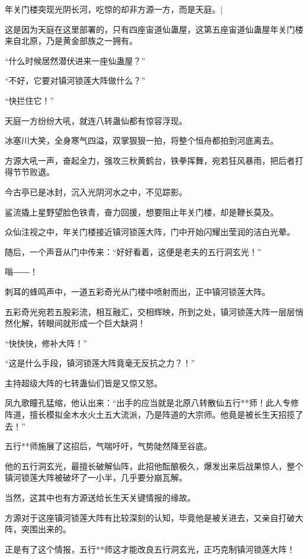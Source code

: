 
\begin{this_body}

年关门楼突现光阴长河，吃惊的却非方源一方，而是天庭。|

这是因为天庭在这里部署的，只有四座宙道仙蛊屋，这第五座宙道仙蛊屋年关门楼来自北原，乃是黄金部族之一拥有。

“什么时候居然潜伏进来一座仙蛊屋？”

“不好，它要对镇河锁莲大阵做什么？”

“快拦住它！”

天庭一方纷纷大吼，就连八转蛊仙都有惊容浮现。

冰塞川大笑，全身寒气四溢，双掌狠狠一拍，将整个恒舟都拍到河底离去。

方源大吼一声，奋起全力，强攻三秋黄鹤台，铁拳挥舞，宛若狂风暴雨，把后者打得节节败退。

今古亭已是冰封，沉入光阴河水之中，不见踪影。

鲨流撬上星野望脸色铁青，奋力回援，想要阻止年关门楼，却是鞭长莫及。

众仙注视之中，年关门楼接近镇河锁莲大阵，门中开始闪耀出莹润的洁白光晕。

随后，一个声音从门中传来：“好好看着，这便是老夫的五行洞玄光！”

嗡――！

刺耳的蜂鸣声中，一道五彩奇光从门楼中喷射而出，正中镇河锁莲大阵。

五彩奇光宛若五股彩流，相互融汇，交相辉映，所到之处，镇河锁莲大阵一层层悄然化解，转眼间就形成一个巨大缺洞！

“快快快，修补大阵！”

“这是什么手段，镇河锁莲大阵竟毫无反抗之力？！”

主持超级大阵的七转蛊仙们皆是又惊又怒。

凤九歌瞳孔猛缩，他认出来：“出手的应当就是北原八转散仙五行**师！此人专修阵道，擅长模拟金木水火土五大流派，乃是阵道的大宗师。他竟是被长生天招揽了去！”

五行**师施展了这招后，气喘吁吁，气势陡然降至谷底。

他的五行洞玄光，最擅长破解仙阵，此招他酝酿极久，爆发出来后战果惊人，整个镇河锁莲大阵被破坏了一小半，几乎要分崩瓦解。

当然，这其中也有方源送给长生天关键情报的缘故。

方源对于这座镇河锁莲大阵有比较深刻的认知，毕竟他是被关进去，又亲自打破大阵，突围出来的。

正是有了这个情报，五行**师这才能改良五行洞玄光，正巧克制镇河锁莲大阵！


\end{this_body}

